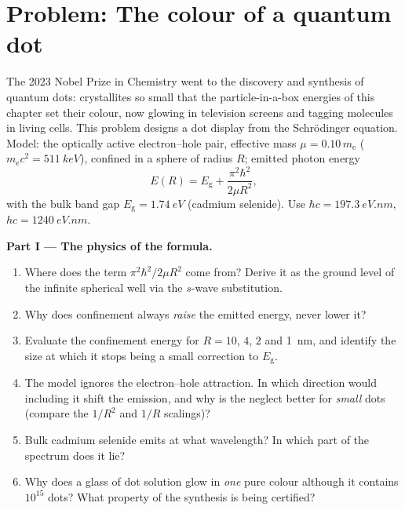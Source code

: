\section{Problem: The colour of a quantum dot}

\begin{problem}\label{pb:b3:schrodinger-three-dimensions:1}
The 2023 Nobel Prize in Chemistry went to the discovery and synthesis
of quantum dots: crystallites so small that the particle-in-a-box
energies of this chapter set their colour, now glowing in television
screens and tagging molecules in living cells. This problem designs a
dot display from the Schrödinger equation. Model: the optically
active electron--hole pair, effective mass $\mu = 0.10\,m_{\text{e}}$
($m_{\text{e}}c^2 = \qty{511}{keV}$), confined in a sphere of radius
$R$; emitted photon energy
\[
E(R) = E_{\text{g}} + \frac{\pi^2\hbar^2}{2\mu R^2} ,
\]
with the bulk band gap $E_{\text{g}} = \qty{1.74}{eV}$ (cadmium
selenide). Use $\hbar c = \qty{197.3}{eV.nm}$, $hc =
\qty{1240}{eV.nm}$.

\medskip\noindent\textbf{Part I --- The physics of the formula.}
\begin{enumerate}
  \item Where does the term $\pi^2\hbar^2/2\mu R^2$ come from? Derive
        it as the ground level of the infinite spherical well via the
        $s$-wave substitution.
  \item Why does confinement always \emph{raise} the emitted energy,
        never lower it?
  \item Evaluate the confinement energy for $R = 10$, $4$, $2$ and
        \qty{1}{nm}, and identify the size at which it stops being a
        small correction to $E_{\text{g}}$.
  \item The model ignores the electron--hole attraction. In which
        direction would including it shift the emission, and why is
        the neglect better for \emph{small} dots (compare the $1/R^2$
        and $1/R$ scalings)?
  \item Bulk cadmium selenide emits at what wavelength? In which part
        of the spectrum does it lie?
  \item Why does a glass of dot solution glow in \emph{one} pure
        colour although it contains $10^{15}$ dots? What property of
        the synthesis is being certified?
\end{enumerate}


\end{problem}
